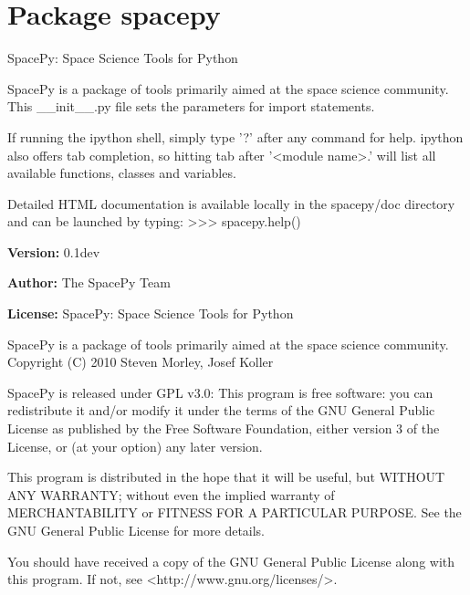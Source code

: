 %
%
%


\section{Package spacepy}

    \label{spacepy}
SpacePy: Space Science Tools for Python

SpacePy is a package of tools primarily aimed at the space science 
community. This \_\_init\_\_.py file sets the parameters for import 
statements.

If running the ipython shell, simply type '?' after any command for help. 
ipython also offers tab completion, so hitting tab after '{\textless}module
name{\textgreater}.' will list all available functions, classes and 
variables.

Detailed HTML documentation is available locally in the spacepy/doc 
directory and can be launched by typing: 
{\textgreater}{\textgreater}{\textgreater} spacepy.help()

\textbf{Version:} 0.1dev



\textbf{Author:} The SpacePy Team



\textbf{License:} SpacePy: Space Science Tools for Python

SpacePy is a package of tools primarily aimed at the space science 
community.
Copyright (C) 2010  Steven Morley, Josef Koller

SpacePy is released under GPL v3.0:
This program is free software: you can redistribute it and/or modify
it under the terms of the GNU General Public License as published by
the Free Software Foundation, either version 3 of the License, or
(at your option) any later version.

This program is distributed in the hope that it will be useful,
but WITHOUT ANY WARRANTY; without even the implied warranty of
MERCHANTABILITY or FITNESS FOR A PARTICULAR PURPOSE.  See the
GNU General Public License for more details.

You should have received a copy of the GNU General Public License
along with this program.  If not, see 
{\textless}http://www.gnu.org/licenses/{\textgreater}.




